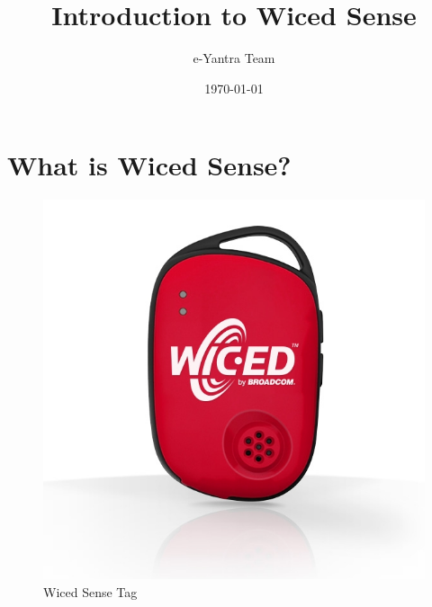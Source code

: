 \documentclass[11pt,a4paper]{article}
\begin{document}
\begin{titlepage}
\title{Introduction to Wiced Sense}
\author{e-Yantra Team}
\date{\today}
\maketitle
\end{titlepage}
 \tableofcontents

\newpage
\section{What is Wiced Sense?}
\begin{figure}[h]
    \centering
	\includegraphics[scale=0.5]{WICED_SENSE.jpg}
	\caption{Wiced Sense Tag}
	\end{figure}
\end{document}
